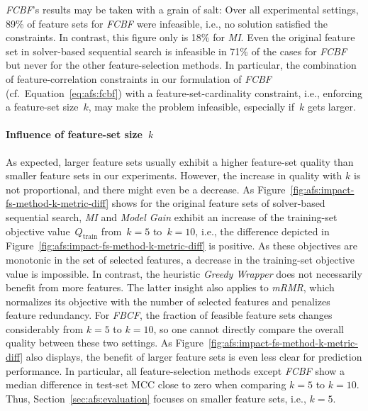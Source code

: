 \documentclass{article}
\theoremstyle{definition}
\begin{document}
\emph{FCBF}'s results may be taken with a grain of salt:
Over all experimental settings, 89\% of feature sets for \emph{FCBF} were infeasible, i.e., no solution satisfied the constraints.
In contrast, this figure only is 18\% for \emph{MI}.
Even the original feature set in solver-based sequential search is infeasible in 71\% of the cases for \emph{FCBF} but never for the other feature-selection methods.
In particular, the combination of feature-correlation constraints in our formulation of \emph{FCBF} (cf.~Equation~\ref{eq:afs:fcbf}) with a feature-set-cardinality constraint, i.e., enforcing a feature-set size~$k$, may make the problem infeasible, especially if~$k$ gets larger.

\paragraph{Influence of feature-set size~$k$}

As expected, larger feature sets usually exhibit a higher feature-set quality than smaller feature sets in our experiments.
However, the increase in quality with $k$ is not proportional, and there might even be a decrease.
As Figure~\ref{fig:afs:impact-fs-method-k-metric-diff} shows for the original feature sets of solver-based sequential search, \emph{MI} and \emph{Model Gain} exhibit an increase of the training-set objective value~$Q_\text{train}$ from~$k=5$ to~$k=10$, i.e., the difference depicted in Figure~\ref{fig:afs:impact-fs-method-k-metric-diff} is positive.
As these objectives are monotonic in the set of selected features, a decrease in the training-set objective value is impossible.
In contrast, the heuristic \emph{Greedy Wrapper} does not necessarily benefit from more features.
The latter insight also applies to \emph{mRMR}, which normalizes its objective with the number of selected features and penalizes feature redundancy.
For \emph{FBCF}, the fraction of feasible feature sets changes considerably from $k=5$ to $k=10$, so one cannot directly compare the overall quality between these two settings.
As Figure~\ref{fig:afs:impact-fs-method-k-metric-diff} also displays, the benefit of larger feature sets is even less clear for prediction performance.
In particular, all feature-selection methods except \emph{FCBF} show a median difference in test-set MCC close to zero when comparing $k=5$ to $k=10$.
Thus, Section~\ref{sec:afs:evaluation} focuses on smaller feature sets, i.e., $k=5$.

\renewcommand*{\bibfont}{\small} %
\printbibliography
\end{document}
